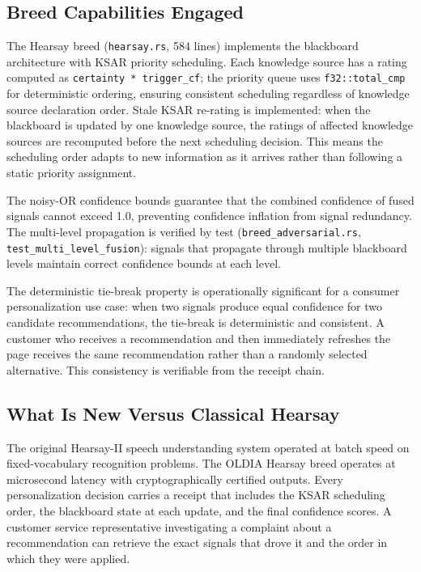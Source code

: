 \subsection*{Breed Capabilities Engaged}

The Hearsay breed (\texttt{hearsay.rs}, 584 lines) implements the blackboard
architecture with KSAR priority scheduling. Each knowledge source has a
rating computed as \texttt{certainty * trigger\_cf}; the priority queue uses
\texttt{f32::total\_cmp} for deterministic ordering, ensuring consistent scheduling
regardless of knowledge source declaration order. Stale KSAR re-rating is implemented:
when the blackboard is updated by one knowledge source, the ratings of affected
knowledge sources are recomputed before the next scheduling decision. This means
the scheduling order adapts to new information as it arrives rather than following
a static priority assignment.

The noisy-OR confidence bounds guarantee that the combined confidence of fused
signals cannot exceed 1.0, preventing confidence inflation from signal redundancy.
The multi-level propagation is verified by test (\texttt{breed\_adversarial.rs},
\texttt{test\_multi\_level\_fusion}): signals that propagate through multiple
blackboard levels maintain correct confidence bounds at each level.

The deterministic tie-break property is operationally significant for a consumer
personalization use case: when two signals produce equal confidence for two
candidate recommendations, the tie-break is deterministic and consistent. A customer
who receives a recommendation and then immediately refreshes the page receives the
same recommendation rather than a randomly selected alternative. This consistency
is verifiable from the receipt chain.

\subsection*{What Is New Versus Classical Hearsay}

The original Hearsay-II speech understanding system operated at batch speed on
fixed-vocabulary recognition problems. The OLDIA Hearsay breed operates at
microsecond latency with cryptographically certified outputs. Every personalization
decision carries a receipt that includes the KSAR scheduling order, the blackboard
state at each update, and the final confidence scores. A customer service
representative investigating a complaint about a recommendation can retrieve the
exact signals that drove it and the order in which they were applied.

